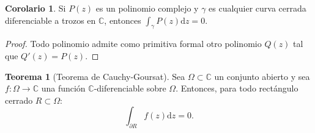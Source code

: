 \documentclass[11pt,a4paper]{article}
\theoremstyle{definition}
\newtheorem{teorema}{Teorema}[section]
\newtheorem{corolario}{Corolario}[section]
\theoremstyle{remark}
\numberwithin{equation}{section}
\newcommand{\dz}{\mathrm{d}z}
\begin{document}
\begin{corolario}
Si $P(z)$ es un polinomio complejo y $\gamma$ es cualquier curva cerrada diferenciable a trozos en $\mathbb{C}$, entonces $\int_\gamma P(z) \dz = 0$.
\end{corolario}
\begin{proof}
Todo polinomio admite como primitiva formal otro polinomio $Q(z)$ tal que $Q'(z) = P(z)$.
\end{proof}

\begin{teorema}[Teorema de Cauchy-Goursat]
Sea $\Omega \subset \mathbb{C}$ un conjunto abierto y sea $f: \Omega \to \mathbb{C}$ una función $\mathbb{C}$-diferenciable sobre $\Omega$. Entonces, para todo rectángulo cerrado $R \subset \Omega$:
\begin{equation}
\int_{\partial R} f(z) \dz = 0.
\end{equation}
\end{teorema}
\end{document}
